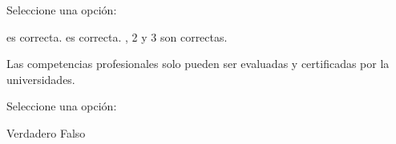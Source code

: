 \documentclass[a4paper,answers]{exam}
\begin{document}
\begin{questions}
  Seleccione una opción:

  \begin{choices}
     es correcta.
     es correcta.
    , 2 y 3 son correctas.
  \end{choices}

  \question Las competencias profesionales solo pueden ser evaluadas y
  certificadas por la universidades.

  Seleccione una opción:

  \begin{choices}
    \choice Verdadero
    \CorrectChoice Falso
  \end{choices}
  
\end{questions}
\end{document}
